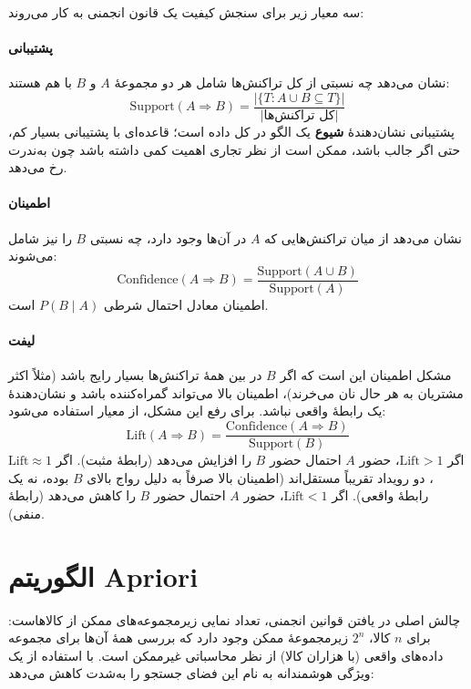 سه معیار زیر برای سنجش کیفیت یک قانون انجمنی به کار می‌روند:

\paragraph{پشتیبانی}
 نشان می‌دهد چه نسبتی از کل تراکنش‌ها
شامل هر دو مجموعهٔ $A$ و $B$ با هم هستند:
\[
\text{Support}(A \Rightarrow B) = \frac{|\{T : A \cup B \subseteq T\}|}{|\text{کل تراکنش‌ها}|}
\]
پشتیبانی نشان‌دهندهٔ \textbf{شیوع} یک الگو در کل داده است؛ قاعده‌ای با
پشتیبانی بسیار کم، حتی اگر جالب باشد، ممکن است از نظر تجاری اهمیت کمی
داشته باشد چون به‌ندرت رخ می‌دهد.

\paragraph{اطمینان}
 نشان می‌دهد از میان تراکنش‌هایی که
$A$ در آن‌ها وجود دارد، چه نسبتی $B$ را نیز شامل می‌شوند:
\[
\text{Confidence}(A \Rightarrow B) = \frac{\text{Support}(A \cup B)}{\text{Support}(A)}
\]
اطمینان معادل احتمال شرطی $P(B \mid A)$ است.

\paragraph{لیفت}
مشکل اطمینان این است که اگر $B$ در بین همهٔ تراکنش‌ها بسیار رایج باشد
(مثلاً اکثر مشتریان به هر حال نان می‌خرند)، اطمینان بالا می‌تواند
گمراه‌کننده باشد و نشان‌دهندهٔ یک رابطهٔ واقعی نباشد. برای رفع این مشکل،
از معیار  استفاده می‌شود:
\[
\text{Lift}(A \Rightarrow B) = \frac{\text{Confidence}(A \Rightarrow B)}{\text{Support}(B)}
\]
اگر $\text{Lift} > 1$، حضور $A$ احتمال حضور $B$ را افزایش می‌دهد (رابطهٔ
مثبت). اگر $\text{Lift} \approx 1$، دو رویداد تقریباً مستقل‌اند (اطمینان
بالا صرفاً به دلیل رواج بالای $B$ بوده، نه یک رابطهٔ واقعی). اگر
$\text{Lift} < 1$، حضور $A$ احتمال حضور $B$ را کاهش می‌دهد (رابطهٔ
منفی).

\section{الگوریتم Apriori}

چالش اصلی در یافتن قوانین انجمنی، تعداد نمایی زیرمجموعه‌های ممکن از
کالاهاست: برای $n$ کالا، $2^n$ زیرمجموعهٔ ممکن وجود دارد که بررسی همهٔ
آن‌ها برای مجموعه داده‌های واقعی (با هزاران کالا) از نظر محاسباتی
غیرممکن است. 
با استفاده از یک ویژگی هوشمندانه به نام
 این فضای جستجو را
به‌شدت کاهش می‌دهد:

